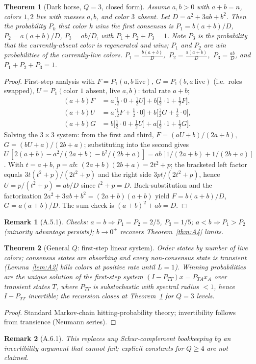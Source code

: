 \documentclass[preprint,12pt]{elsarticle}
\newtheorem{theorem}{Theorem}[section]
\newtheorem{remark}{Remark}[theorem]
\begin{document}
\begin{theorem}[Dark horse, $Q=3$, closed form]
\label{thm:A5}
Assume $a,b>0$ with $a+b=n$, colors $1,2$ live with masses $a,b$, and
color $3$ absent. Let $D=a^2+3ab+b^2$. Then the probability $P_k$ that
color $k$ wins the first consensus is $P_1=b(a+b)/D$, $P_2=a(a+b)/D$,
$P_3=ab/D$, with $P_1+P_2+P_3=1$. Note $P_3$ is the probability that
the currently-absent color is regenerated and wins; $P_1$ and $P_2$ are
win probabilities of the currently-live colors.
$P_1=\frac{b(a+b)}{D}$,\ $P_2=\frac{a(a+b)}{D}$,\ $P_3=\frac{ab}{D}$,
and $P_1+P_2+P_3=1$.
\end{theorem}
\begin{proof}
First-step analysis with $F=P_1(a,b\ \mathrm{live})$,
$G=P_1(b,a\ \mathrm{live})$ (i.e.\ roles swapped),
$U=P_1(\text{color }1\text{ absent, live }a,b)$: total rate $a+b$;
\begin{align*}
(a+b)F &= a\Big[\tfrac12\cdot0+\tfrac12 U\Big]
       + b\Big[\tfrac12\cdot1+\tfrac12 F\Big],\\
(a+b)U &= a\Big[\tfrac12 F+\tfrac12\cdot0\Big]
       + b\Big[\tfrac12 G+\tfrac12\cdot0\Big],\\
(a+b)G &= b\Big[\tfrac12\cdot0+\tfrac12 U\Big]
       + a\Big[\tfrac12\cdot1+\tfrac12 G\Big].
\end{align*}
Solving the $3\times3$ system: from the first and third,
$F=(aU+b)/(2a+b)$, $G=(bU+a)/(2b+a)$; substituting into the second gives
$U\,[2(a+b)-a^2/(2a+b)-b^2/(2b+a)]
=ab[1/(2a+b)+1/(2b+a)]$. With $t=a+b$, $p=ab$:
$(2a+b)(2b+a)=2t^2+p$; the bracketed left factor equals
$3t(t^2+p)/(2t^2+p)$ and the right side $3pt/(2t^2+p)$, hence
$U=p/(t^2+p)=ab/D$ since $t^2+p=D$. Back-substitution and the
factorization $2a^2+3ab+b^2=(2a+b)(a+b)$ yield $F=b(a+b)/D$,
$G=a(a+b)/D$. The sum check is $(a+b)^2+ab=D$.
\end{proof}
\begin{remark}[A.5.1]
\label{rem:A5.1}
Checks: $a=b\Rightarrow P_1=P_2=2/5$, $P_3=1/5$;
$a<b\Rightarrow P_1>P_2$ (minority advantage persists);
$b\to0^+$ recovers Theorem~\ref{thm:A4} limits.
\end{remark}

\begin{theorem}[General $Q$: first-step linear system]
\label{thm:A6}
Order states by number of live colors; consensus states are absorbing
and every non-consensus state is transient (Lemma~\ref{lem:A2} kills
colors at positive rate until $L=1$). Winning probabilities are the
unique solution of the first-step system
$(I-P_{TT})x=P_{TA}x_A$ over transient states $T$, where $P_{TT}$ is
substochastic with spectral radius $<1$, hence $I-P_{TT}$ invertible;
the recursion closes at Theorem~\ref{thm:A5} for $Q=3$ levels.
\end{theorem}
\begin{proof}
Standard Markov-chain hitting-probability theory; invertibility follows
from transience (Neumann series).
\end{proof}
\begin{remark}[A.6.1]
\label{rem:A6.1}
This replaces any Schur-complement bookkeeping by an invertibility
argument that cannot fail; explicit constants for $Q\ge4$ are not
claimed.
\end{remark}
\end{document}
